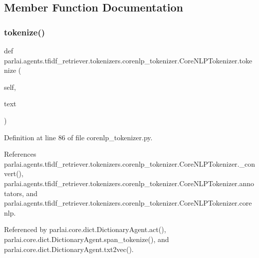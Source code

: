 \subsection{Member Function Documentation}
\mbox{\label{classparlai_1_1agents_1_1tfidf__retriever_1_1tokenizers_1_1corenlp__tokenizer_1_1CoreNLPTokenizer_af7fb8c70ddbd8c11e3e32365af30e567}} 
\subsubsection{\texorpdfstring{tokenize()}{tokenize()}}
{\footnotesize\ttfamily def parlai.\+agents.\+tfidf\+\_\+retriever.\+tokenizers.\+corenlp\+\_\+tokenizer.\+Core\+N\+L\+P\+Tokenizer.\+tokenize (\begin{DoxyParamCaption}\item[{}]{self,  }\item[{}]{text }\end{DoxyParamCaption})}



Definition at line 86 of file corenlp\+\_\+tokenizer.\+py.



References parlai.\+agents.\+tfidf\+\_\+retriever.\+tokenizers.\+corenlp\+\_\+tokenizer.\+Core\+N\+L\+P\+Tokenizer.\+\_\+convert(), parlai.\+agents.\+tfidf\+\_\+retriever.\+tokenizers.\+corenlp\+\_\+tokenizer.\+Core\+N\+L\+P\+Tokenizer.\+annotators, and parlai.\+agents.\+tfidf\+\_\+retriever.\+tokenizers.\+corenlp\+\_\+tokenizer.\+Core\+N\+L\+P\+Tokenizer.\+corenlp.



Referenced by parlai.\+core.\+dict.\+Dictionary\+Agent.\+act(), parlai.\+core.\+dict.\+Dictionary\+Agent.\+span\+\_\+tokenize(), and parlai.\+core.\+dict.\+Dictionary\+Agent.\+txt2vec().


